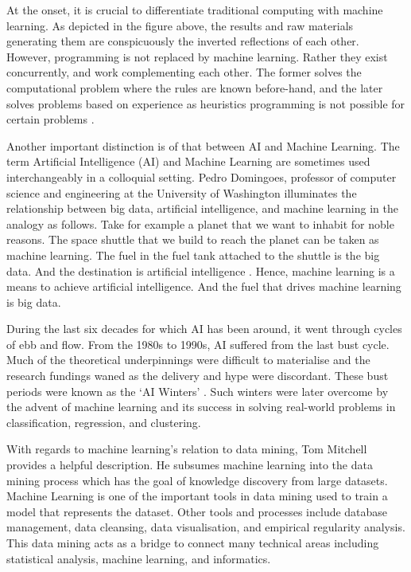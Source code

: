 At the onset, it is crucial to differentiate traditional computing with machine learning. As depicted in the figure above, the results and raw materials generating them are conspicuously the inverted reflections of each other. However, programming is not replaced by machine learning. Rather they exist concurrently, and work complementing each other. The former solves the computational problem where the rules are known before-hand, and the later solves problems based on experience as heuristics programming is not possible for certain problems \parencite{mitchell_machine_1997}.

Another important distinction is of that between AI and Machine Learning. The term Artificial Intelligence (AI) and Machine Learning are sometimes used interchangeably in a colloquial setting. Pedro Domingoes, professor of computer science and engineering at the University of Washington illuminates the relationship between big data, artificial intelligence, and machine learning in the analogy as follows. Take for example a planet that we want to inhabit for noble reasons. The space shuttle that we build to reach the planet can be taken as machine learning. The fuel in the fuel tank attached to the shuttle is the big data. And the destination is artificial intelligence \parencite*{domingos_what_2019}. Hence, machine learning is a means to achieve artificial intelligence. And the fuel that drives machine learning is big data.

During the last six decades for which AI has been around, it went through cycles of ebb and flow. From the 1980s to 1990s, AI suffered from the last bust cycle. Much of the theoretical underpinnings were difficult to materialise and the research fundings waned as the delivery and hype were discordant. These bust periods were known as the `AI Winters' \parencite{rebala_introduction_2019}. Such winters were later overcome by the advent of machine learning and its success in solving real-world problems in classification, regression, and clustering.

With regards to machine learning's relation to data mining, Tom Mitchell provides a helpful description. He subsumes machine learning into the data mining process which has the goal of knowledge discovery from large datasets. Machine Learning is one of the important tools in data mining used to train a model that represents the dataset. Other tools and processes include database management, data cleansing, data visualisation, and empirical regularity analysis. This data mining acts as a bridge to connect many technical areas including statistical analysis, machine learning, and informatics\parencite*{mitchell_machine_1999}.

